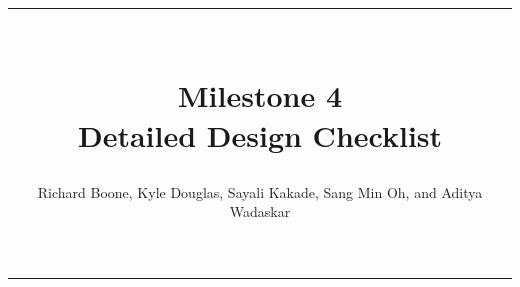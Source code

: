 \documentclass[12pt]{article}
\title{\rule{7in}{1pt} \\ 
	Milestone 4 \\ 
	\Large Detailed Design Checklist}
\author{Richard Boone, Kyle Douglas, Sayali Kakade, Sang Min Oh, and Aditya Wadaskar}
\begin{document}
\maketitle\vspace{-45pt}

\begin{center}
\rule{7in}{1pt}
\end{center}

\end{document}
